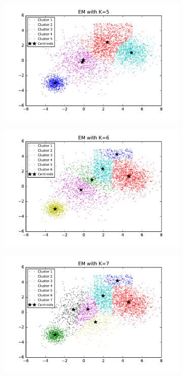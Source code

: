 \begin{description}
\begin{description}
\begin{figure}[!h]
\begin{subfigure}[b]{0.475\textwidth}
            \includegraphics[width=\textwidth]{./figures/bigClustering_EM_5.pdf}
        \end{subfigure}
        \hfill
        \begin{subfigure}[b]{0.475\textwidth}   
            \centering 
            \includegraphics[width=\textwidth]{./figures/bigClustering_EM_6.pdf}
        \end{subfigure}
        \begin{subfigure}[b]{0.475\textwidth}   
            \centering 
            \includegraphics[width=\textwidth]{./figures/bigClustering_EM_7.pdf}

\end{subfigure}
\end{figure}
\end{description}
\end{description}
